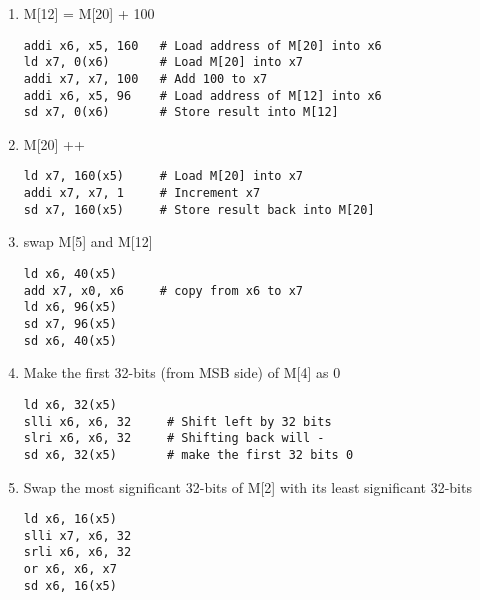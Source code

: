 \begin{enumerate}
    \item M[12] = M[20] + 100
\begin{lstlisting}
addi x6, x5, 160   # Load address of M[20] into x6
ld x7, 0(x6)       # Load M[20] into x7
addi x7, x7, 100   # Add 100 to x7
addi x6, x5, 96    # Load address of M[12] into x6
sd x7, 0(x6)       # Store result into M[12]
\end{lstlisting}
    \item M[20] ++
\begin{lstlisting}
ld x7, 160(x5)     # Load M[20] into x7
addi x7, x7, 1     # Increment x7
sd x7, 160(x5)     # Store result back into M[20]
\end{lstlisting}
    \item swap M[5] and M[12]
\begin{lstlisting}
ld x6, 40(x5)
add x7, x0, x6     # copy from x6 to x7
ld x6, 96(x5)
sd x7, 96(x5)
sd x6, 40(x5)
\end{lstlisting}
    \item Make the first 32-bits (from MSB side) of M[4] as 0
\begin{lstlisting}
ld x6, 32(x5)
slli x6, x6, 32     # Shift left by 32 bits
slri x6, x6, 32     # Shifting back will -
sd x6, 32(x5)       # make the first 32 bits 0
\end{lstlisting}
    \item Swap the most significant 32-bits of M[2] with its least significant 32-bits
\begin{lstlisting}
ld x6, 16(x5)       
slli x7, x6, 32     
srli x6, x6, 32
or x6, x6, x7
sd x6, 16(x5)
\end{lstlisting}

\end{enumerate}


